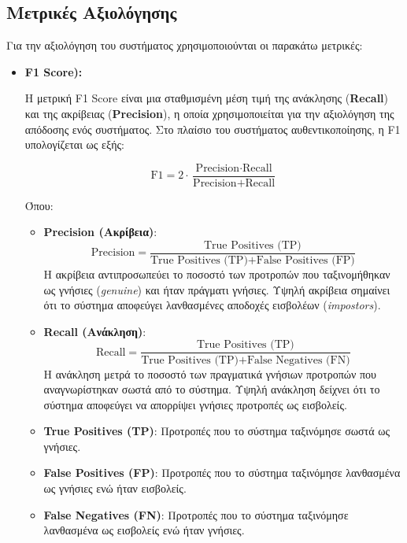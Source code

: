 \subsection{Μετρικές Αξιολόγησης}
\label{subsec:metrics}
Για την αξιολόγηση του συστήματος χρησιμοποιούνται οι παρακάτω μετρικές:
\begin{itemize}
    \item \textbf{F1 Score):}

    Η μετρική F1 Score είναι μια σταθμισμένη μέση τιμή της ανάκλησης (\textbf{Recall}) και της ακρίβειας (\textbf{Precision}), η οποία χρησιμοποιείται για την αξιολόγηση της απόδοσης ενός συστήματος. Στο πλαίσιο του συστήματος αυθεντικοποίησης, η F1 υπολογίζεται ως εξής:

    \[
    \text{F1} = 2 \cdot \frac{\text{Precision} \cdot \text{Recall}}{\text{Precision} + \text{Recall}}
    \]
    
    Όπου:
    \begin{itemize}
    \item \textbf{Precision (Ακρίβεια)}:
    \[
    \text{Precision} = \frac{\text{True Positives (TP)}}{\text{True Positives (TP)} + \text{False Positives (FP)}}
    \]
    Η ακρίβεια αντιπροσωπεύει το ποσοστό των προτροπών που ταξινομήθηκαν ως γνήσιες (\textit{genuine}) και ήταν πράγματι γνήσιες. Υψηλή ακρίβεια σημαίνει ότι το σύστημα αποφεύγει λανθασμένες αποδοχές εισβολέων (\textit{impostors}).
    
    \item \textbf{Recall (Ανάκληση)}:
    \[
    \text{Recall} = \frac{\text{True Positives (TP)}}{\text{True Positives (TP)} + \text{False Negatives (FN)}}
    \]
    Η ανάκληση μετρά το ποσοστό των πραγματικά γνήσιων προτροπών που αναγνωρίστηκαν σωστά από το σύστημα. Υψηλή ανάκληση δείχνει ότι το σύστημα αποφεύγει να απορρίψει γνήσιες προτροπές ως εισβολείς.
    
    \item \textbf{True Positives (TP)}:
    Προτροπές που το σύστημα ταξινόμησε σωστά ως γνήσιες.
    
    \item \textbf{False Positives (FP)}:
    Προτροπές που το σύστημα ταξινόμησε λανθασμένα ως γνήσιες ενώ ήταν εισβολείς.
    
    \item \textbf{False Negatives (FN)}:
    Προτροπές που το σύστημα ταξινόμησε λανθασμένα ως εισβολείς ενώ ήταν γνήσιες.
    \end{itemize}
    

\end{itemize}
